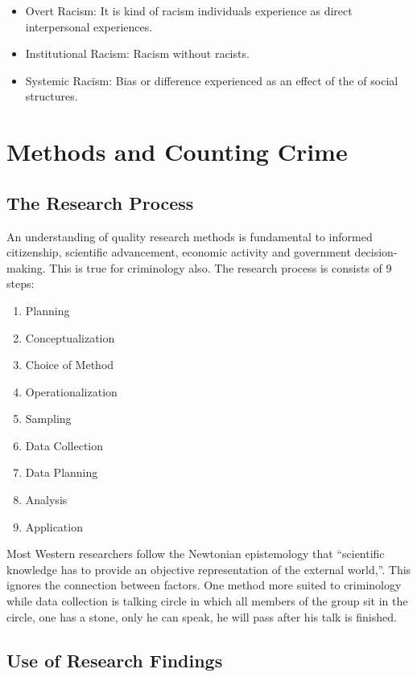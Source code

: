 \documentclass{article}
\begin{document}
\begin{itemize}
    \item Overt Racism: It is kind of racism individuals experience as direct interpersonal experiences.
    
    \item Institutional Racism: Racism without racists.
    
    \item Systemic Racism: Bias or difference experienced as an 
    effect of the of social structures.
\end{itemize}

\section{Methods and Counting Crime}

\subsection{The Research Process}

An understanding of quality research methods is fundamental to informed citizenship, scientific advancement, economic activity and government decision-making. This is true for criminology also. The research process is consists of 9 steps:

\begin{enumerate}
    \item Planning
    \item Conceptualization
    \item Choice of Method
    \item Operationalization
    \item Sampling
    \item Data Collection
    \item Data Planning
    \item Analysis
    \item Application
\end{enumerate}

Most Western researchers follow the Newtonian epistemology that “scientific knowledge has to provide an objective representation of the external world,”. This ignores the connection between factors. One method more suited to criminology while data collection is talking circle in which all members of the group sit in the circle, one has a stone, only he can speak, he will pass after his talk is finished.

\subsection{Use of Research Findings}
\end{document}
